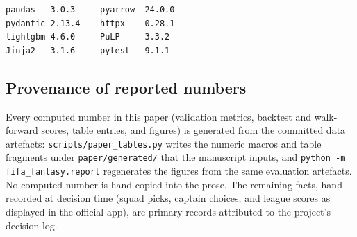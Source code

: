 \begin{verbatim}
pandas   3.0.3     pyarrow  24.0.0
pydantic 2.13.4    httpx    0.28.1
lightgbm 4.6.0     PuLP     3.3.2
Jinja2   3.1.6     pytest   9.1.1
\end{verbatim}

\subsection{Provenance of reported numbers}
\label{sec:appendix-a-provenance}

Every computed number in this paper (validation metrics, backtest and
walk-forward scores, table entries, and figures) is generated from
the committed data artefacts: \texttt{scripts/paper\_tables.py}
writes the numeric macros and table fragments under
\texttt{paper/generated/} that the manuscript inputs, and
\texttt{python -m fifa\_fantasy.report} regenerates the figures from
the same evaluation artefacts. No computed number is hand-copied into
the prose. The remaining facts, hand-recorded at decision time (squad
picks, captain choices, and league scores as displayed in the
official app), are primary records attributed to the project's
decision log.
